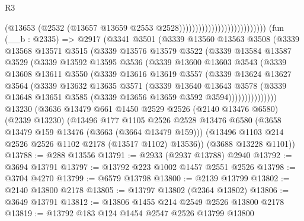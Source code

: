 \begin{lexlean}{R3}
\begin{coremodule}
                                                    (@13653
                                                      (@2532
                                                        (@13657
                                                          @13659
                                                          @2553
                                                          @2528)))))))))))))))))))))))))))
    (fun (__b : @2335) =>
    @2917
      (@3341
        @3501
        (@3339
          @13560
          @13563
          @3508
          (@3339
            @13568
            @13571
            @3515
            (@3339
              @13576
              @13579
              @3522
              (@3339
                @13584
                @13587
                @3529
                (@3339
                  @13592
                  @13595
                  @3536
                  (@3339
                    @13600
                    @13603
                    @3543
                    (@3339
                      @13608
                      @13611
                      @3550
                      (@3339
                        @13616
                        @13619
                        @3557
                        (@3339
                          @13624
                          @13627
                          @3564
                          (@3339
                            @13632
                            @13635
                            @3571
                            (@3339
                              @13640
                              @13643
                              @3578
                              (@3339
                                @13648
                                @13651
                                @3585
                                (@3339 @13656 @13659 @3592 @3594)))))))))))))))
    @13230
    (@3636
      @13479
      @661
      @1450
      @2529
      @2526
      (@2140 @13476 @6580)
      (@2339 @13230)
      (@13496
        @177
        @1105
        @2526
        @2528
        @13476
        @6580
        (@3658 @13479 @159 @13476 (@3663 (@3664 @13479 @159)))
        (@13496 @1103 @214 @2526 @2526 @1102 @2178 (@13517 @1102) @13536))
      (@3688 @13228 @1101))
@13788 := @288 @13556
@13791 := @2933 (@2937 @13788) @2940
@13792 := @3694 @13791
@13797 := @13792 @223 @1002 @1457 @2551 @2526
@13798 := @3704 @4270
@13799 := @6579 @13798
@13800 := @2139 @13799
@13802 := @2140 @13800 @2178
@13805 := @13797 @13802 (@2364 @13802)
@13806 := @3649 @13791
@13812 := @13806 @1455 @214 @2549 @2526 @13800 @2178
@13819 := @13792 @183 @124 @1454 @2547 @2526 @13799 @13800

\end{coremodule}
\end{lexlean}
